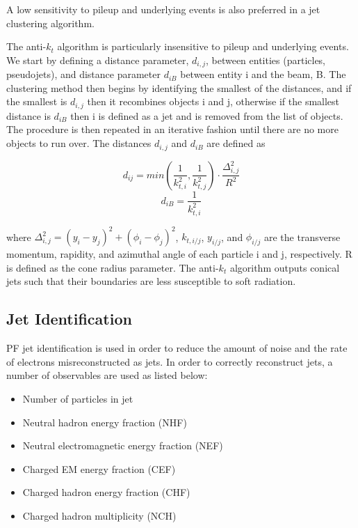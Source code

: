 A low sensitivity to pileup and underlying events is also preferred in a jet clustering algorithm.

The anti-$k_t$ algorithm is particularly insensitive to pileup and underlying events. We start by defining a distance parameter, $d_{i,j}$, between entities (particles, pseudojets), and distance parameter $d_{iB}$ between entity i and the beam, B. The clustering method then begins by identifying the smallest of the distances, and if the smallest is $d_{i,j}$ then it recombines objects i and j, otherwise if the smallest distance is $d_{iB}$ then i is defined as a jet and is removed from the list of objects. The procedure is then repeated in an iterative fashion until there are no more objects to run over. The distances $d_{i,j}$ and $d_{iB}$ are defined as

\begin{equation}
d_{ij} = min\left(\frac{1}{k^2_{t,i}}, \frac{1}{k^2_{t,j}} \right) \cdot \frac{\Delta^2_{i,j}}{R^2}
\end{equation}
\begin{equation}
d_{iB} = \frac{1}{k^2_{t,i}}
\end{equation}

where $\Delta^2_{i,j} = (y_i - y_j)^2 + (\phi_i - \phi_j)^2$, $k_{t,i/j}$, $y_{i/j}$, and $\phi_{i/j}$ are the transverse momentum, rapidity, and azimuthal angle of each particle i and j, respectively. R is defined as the cone radius parameter. The anti-$k_t$ algorithm outputs conical jets such that their boundaries are less susceptible to soft radiation.

\subsection{Jet Identification} \label{subsec-JetIdentification}

PF jet identification is used in order to reduce the amount of noise and the rate of electrons misreconstructed as jets. In order to correctly reconstruct jets, a number of observables are used as listed below:

\begin{itemize}
	\item Number of particles in jet 
	\item Neutral hadron energy fraction (NHF) 
	\item Neutral electromagnetic energy fraction (NEF)
	\item Charged EM energy fraction (CEF)
	\item Charged hadron energy fraction (CHF)
	\item Charged hadron multiplicity (NCH)
\end{itemize}	

